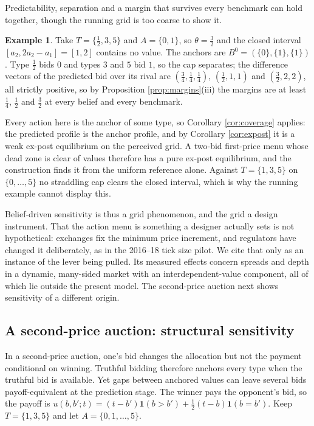\documentclass[12pt]{article}
\theoremstyle{definition}
\newtheorem{example}{Example}
\begin{document}
Predictability, separation and a margin that survives every benchmark can hold together, though the running grid is too coarse to show it.

\begin{example}\label{ex:strict}
Take $T = \{\tfrac12, 3, 5\}$ and $A = \{0, 1\}$, so $\theta = \tfrac32$ and the closed interval $[a_2, 2a_2 - a_1] = [1,2]$ contains no value. The anchors are $B^0 = (\{0\}, \{1\}, \{1\})$. Type $\tfrac12$ bids $0$ and types $3$ and $5$ bid $1$, so the cap separates; the difference vectors of the predicted bid over its rival are $(\tfrac34, \tfrac14, \tfrac14)$, $(\tfrac12, 1, 1)$ and $(\tfrac32, 2, 2)$, all strictly positive, so by Proposition \ref{prop:margins}(iii) the margins are at least $\tfrac14$, $\tfrac12$ and $\tfrac32$ at every belief and every benchmark.
\end{example}

Every action here is the anchor of some type, so Corollary \ref{cor:coverage} applies: the predicted profile is the anchor profile, and by Corollary \ref{cor:expost} it is a weak ex-post equilibrium on the perceived grid. A two-bid first-price menu whose dead zone is clear of values therefore has a pure ex-post equilibrium, and the construction finds it from the uniform reference alone. Against $T = \{1,3,5\}$ on $\{0,\dots,5\}$ no straddling cap clears the closed interval, which is why the running example cannot display this.


Belief-driven sensitivity is thus a grid phenomenon, and the grid a design instrument. That the action menu is something a designer actually sets is not hypothetical: exchanges fix the minimum price increment, and regulators have changed it deliberately, as in the 2016--18 tick size pilot. We cite that only as an instance of the lever being pulled. Its measured effects concern spreads and depth in a dynamic, many-sided market with an interdependent-value component, all of which lie outside the present model. The second-price auction next shows sensitivity of a different origin.

\subsection{A second-price auction: structural sensitivity}\label{sec:spa}
In a second-price auction, one's bid changes the allocation but not the payment conditional on winning. Truthful bidding therefore anchors every type when the truthful bid is available. Yet gaps between anchored values can leave several bids payoff-equivalent at the prediction stage. The winner pays the opponent's bid, so the payoff is $u(b, b'; t) = (t - b')\mathbf{1}(b > b') + \tfrac12 (t - b)\mathbf{1}(b = b')$. Keep $T = \{1,3,5\}$ and let $A = \{0, 1, \dots, 5\}$.
\end{document}
